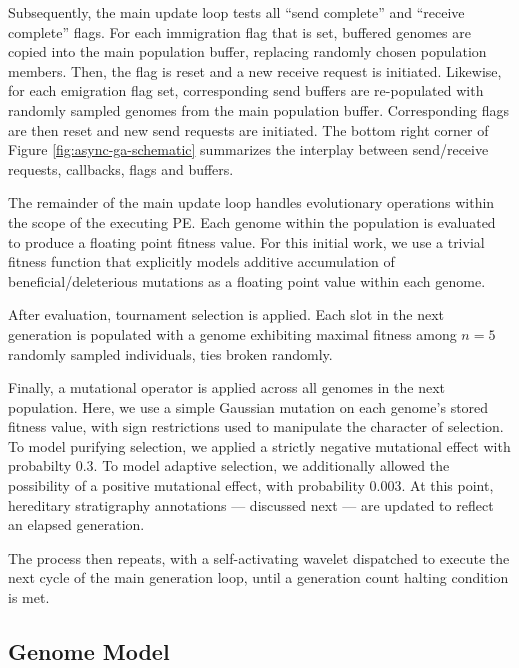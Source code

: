 Subsequently, the main update loop tests all ``send complete'' and ``receive complete'' flags.
For each immigration flag that is set, buffered genomes are copied into the main population buffer, replacing randomly chosen population members.
Then, the flag is reset and a new receive request is initiated.
Likewise, for each emigration flag set, corresponding send buffers are re-populated with randomly sampled genomes from the main population buffer.
Corresponding flags are then reset and new send requests are initiated.
The bottom right corner of Figure \ref{fig:async-ga-schematic} summarizes the interplay between send/receive requests, callbacks, flags and buffers.

The remainder of the main update loop handles evolutionary operations within the scope of the executing PE.
Each genome within the population is evaluated to produce a floating point fitness value.
For this initial work, we use a trivial fitness function that explicitly models additive accumulation of beneficial/deleterious mutations as a floating point value within each genome.

After evaluation, tournament selection is applied. %
Each slot in the next generation is populated with a genome exhibiting maximal fitness among $n=5$ randomly sampled individuals, ties broken randomly.

Finally, a mutational operator is applied across all genomes in the next population.
Here, we use a simple Gaussian mutation on each genome's stored fitness value, with sign restrictions used to manipulate the character of selection.
To model purifying selection, we applied a strictly negative mutational effect with probabilty 0.3.
To model adaptive selection, we additionally allowed the possibility of a positive mutational effect, with probability 0.003.
At this point, hereditary stratigraphy annotations --- discussed next --- are updated to reflect an elapsed generation.

The process then repeats, with a self-activating wavelet dispatched to execute the next cycle of the main generation loop, until a generation count halting condition is met.

\subsection{Genome Model}

